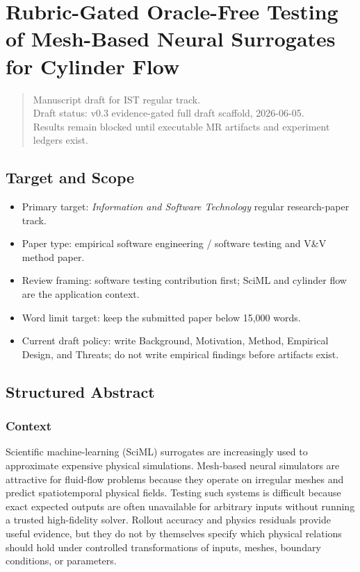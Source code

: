 \section{Rubric-Gated Oracle-Free Testing of Mesh-Based Neural
Surrogates for Cylinder
Flow}\label{rubric-gated-oracle-free-testing-of-mesh-based-neural-surrogates-for-cylinder-flow}

\begin{quote}
Manuscript draft for IST regular track.\\
Draft status: v0.3 evidence-gated full draft scaffold, 2026-06-05.\\
Results remain blocked until executable MR artifacts and experiment
ledgers exist.
\end{quote}

\subsection{Target and Scope}\label{target-and-scope}

\begin{itemize}
\tightlist
\item
  Primary target: \emph{Information and Software Technology} regular
  research-paper track.
\item
  Paper type: empirical software engineering / software testing and V\&V
  method paper.
\item
  Review framing: software testing contribution first; SciML and
  cylinder flow are the application context.
\item
  Word limit target: keep the submitted paper below 15,000 words.
\item
  Current draft policy: write Background, Motivation, Method, Empirical
  Design, and Threats; do not write empirical findings before artifacts
  exist.
\end{itemize}

\subsection{Structured Abstract}\label{structured-abstract}

\subsubsection{Context}\label{context}

Scientific machine-learning (SciML) surrogates are increasingly used to
approximate expensive physical simulations. Mesh-based neural simulators
are attractive for fluid-flow problems because they operate on irregular
meshes and predict spatiotemporal physical fields. Testing such systems
is difficult because exact expected outputs are often unavailable for
arbitrary inputs without running a trusted high-fidelity solver. Rollout
accuracy and physics residuals provide useful evidence, but they do not
by themselves specify which physical relations should hold under
controlled transformations of inputs, meshes, boundary conditions, or
parameters.

